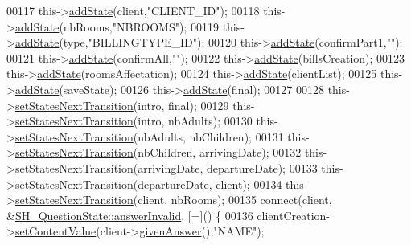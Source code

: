 \begin{DoxyCode}
00117     this->\hyperlink{classSH__InOutStateMachine_a3de9dedcdfd6efab868484c047638f71}{addState}(client,\textcolor{stringliteral}{"CLIENT\_ID"});
00118     this->\hyperlink{classSH__InOutStateMachine_a3de9dedcdfd6efab868484c047638f71}{addState}(nbRooms,\textcolor{stringliteral}{"NBROOMS"});
00119     this->\hyperlink{classSH__InOutStateMachine_a3de9dedcdfd6efab868484c047638f71}{addState}(type,\textcolor{stringliteral}{"BILLINGTYPE\_ID"});
00120     this->\hyperlink{classSH__InOutStateMachine_a3de9dedcdfd6efab868484c047638f71}{addState}(confirmPart1,\textcolor{stringliteral}{""});
00121     this->\hyperlink{classSH__InOutStateMachine_a3de9dedcdfd6efab868484c047638f71}{addState}(confirmAll,\textcolor{stringliteral}{""});
00122     this->\hyperlink{classSH__InOutStateMachine_a3de9dedcdfd6efab868484c047638f71}{addState}(billsCreation);
00123     this->\hyperlink{classSH__InOutStateMachine_a3de9dedcdfd6efab868484c047638f71}{addState}(roomsAffectation);
00124     this->\hyperlink{classSH__InOutStateMachine_a3de9dedcdfd6efab868484c047638f71}{addState}(clientList);
00125     this->\hyperlink{classSH__InOutStateMachine_a3de9dedcdfd6efab868484c047638f71}{addState}(saveState);
00126     this->\hyperlink{classSH__InOutStateMachine_a3de9dedcdfd6efab868484c047638f71}{addState}(\textcolor{keyword}{final});
00127 
00128     this->\hyperlink{classSH__InOutStateMachine_a70d6d81c0a8d4afd6aab0a7239edc237}{setStatesNextTransition}(intro, \textcolor{keyword}{final});
00129     this->\hyperlink{classSH__InOutStateMachine_a70d6d81c0a8d4afd6aab0a7239edc237}{setStatesNextTransition}(intro, nbAdults);
00130     this->\hyperlink{classSH__InOutStateMachine_a70d6d81c0a8d4afd6aab0a7239edc237}{setStatesNextTransition}(nbAdults, nbChildren);
00131     this->\hyperlink{classSH__InOutStateMachine_a70d6d81c0a8d4afd6aab0a7239edc237}{setStatesNextTransition}(nbChildren, arrivingDate);
00132     this->\hyperlink{classSH__InOutStateMachine_a70d6d81c0a8d4afd6aab0a7239edc237}{setStatesNextTransition}(arrivingDate, departureDate);
00133     this->\hyperlink{classSH__InOutStateMachine_a70d6d81c0a8d4afd6aab0a7239edc237}{setStatesNextTransition}(departureDate, client);
00134     this->\hyperlink{classSH__InOutStateMachine_a70d6d81c0a8d4afd6aab0a7239edc237}{setStatesNextTransition}(client, nbRooms);
00135     connect(client, &\hyperlink{classSH__QuestionState_a3348a8a683130678ac87a10ba2a25486}{SH\_QuestionState::answerInvalid}, [=]() \{
00136         clientCreation->\hyperlink{classSH__InOutStateMachine_a9ab1534306b2bdb62743d4bcefe40c17}{setContentValue}(client->\hyperlink{classSH__QuestionState_a29cdea8bc55e39e3ed02d24743c30f8c}{givenAnswer}(),\textcolor{stringliteral}{"NAME"});

\end{DoxyCode}
